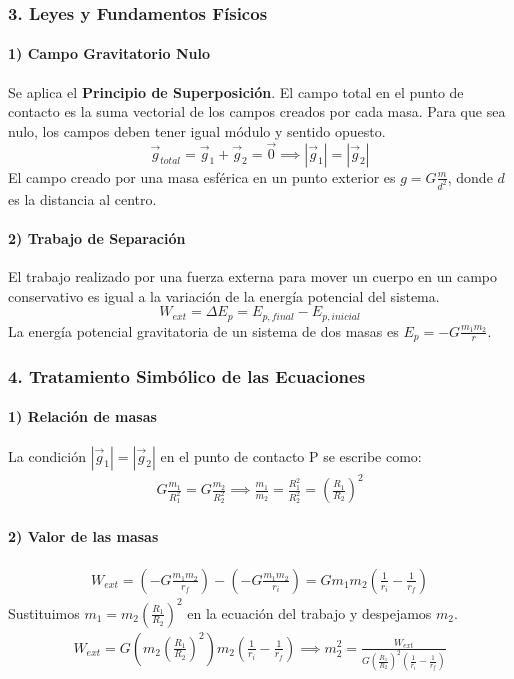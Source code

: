 \subsubsection*{3. Leyes y Fundamentos Físicos}
\paragraph{1) Campo Gravitatorio Nulo}
Se aplica el \textbf{Principio de Superposición}. El campo total en el punto de contacto es la suma vectorial de los campos creados por cada masa. Para que sea nulo, los campos deben tener igual módulo y sentido opuesto.
$$ \vec{g}_{total} = \vec{g}_1 + \vec{g}_2 = \vec{0} \implies |\vec{g}_1| = |\vec{g}_2| $$
El campo creado por una masa esférica en un punto exterior es $g = G\frac{m}{d^2}$, donde $d$ es la distancia al centro.
\paragraph{2) Trabajo de Separación}
El trabajo realizado por una fuerza externa para mover un cuerpo en un campo conservativo es igual a la variación de la energía potencial del sistema.
$$ W_{ext} = \Delta E_p = E_{p,final} - E_{p,inicial} $$
La energía potencial gravitatoria de un sistema de dos masas es $E_p = -G\frac{m_1 m_2}{r}$.

\subsubsection*{4. Tratamiento Simbólico de las Ecuaciones}
\paragraph{1) Relación de masas}
La condición $|\vec{g}_1| = |\vec{g}_2|$ en el punto de contacto P se escribe como:
\begin{gather}
    G\frac{m_1}{R_1^2} = G\frac{m_2}{R_2^2} \implies \frac{m_1}{m_2} = \frac{R_1^2}{R_2^2} = \left(\frac{R_1}{R_2}\right)^2
\end{gather}
\paragraph{2) Valor de las masas}
\begin{gather}
    W_{ext} = \left(-G\frac{m_1 m_2}{r_f}\right) - \left(-G\frac{m_1 m_2}{r_i}\right) = Gm_1m_2\left(\frac{1}{r_i} - \frac{1}{r_f}\right)
\end{gather}
Sustituimos $m_1 = m_2 \left(\frac{R_1}{R_2}\right)^2$ en la ecuación del trabajo y despejamos $m_2$.
\begin{gather}
    W_{ext} = G \left(m_2 \left(\frac{R_1}{R_2}\right)^2\right) m_2 \left(\frac{1}{r_i} - \frac{1}{r_f}\right) \implies m_2^2 = \frac{W_{ext}}{G \left(\frac{R_1}{R_2}\right)^2 \left(\frac{1}{r_i} - \frac{1}{r_f}\right)}
\end{gather}

